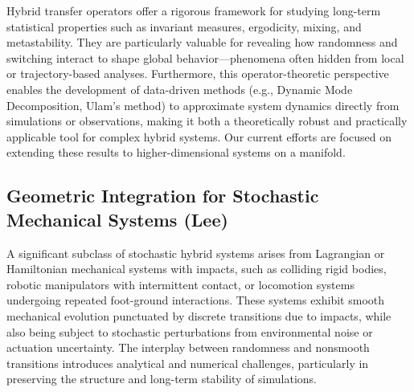\documentclass[letterpaper,11pt]{article}
\begin{document}
Hybrid transfer operators offer a rigorous framework for studying long-term statistical properties such as invariant measures, ergodicity, mixing, and metastability.
They are particularly valuable for revealing how randomness and switching interact to shape global behavior—phenomena often hidden from local or trajectory-based analyses.
Furthermore, this operator-theoretic perspective enables the development of data-driven methods (e.g., Dynamic Mode Decomposition, Ulam’s method) to approximate system dynamics directly from simulations or observations, making it both a theoretically robust and practically applicable tool for complex hybrid systems.
Our current efforts are focused on extending these results to higher-dimensional systems on a manifold.


\subsection{Geometric Integration for Stochastic Mechanical Systems (Lee)}\label{sec:geo_int}

A significant subclass of stochastic hybrid systems arises from Lagrangian or Hamiltonian mechanical systems with impacts, such as colliding rigid bodies, robotic manipulators with intermittent contact, or locomotion systems undergoing repeated foot-ground interactions. 
These systems exhibit smooth mechanical evolution punctuated by discrete transitions due to impacts, while also being subject to stochastic perturbations from environmental noise or actuation uncertainty. 
The interplay between randomness and nonsmooth transitions introduces analytical and numerical challenges, particularly in preserving the structure and long-term stability of simulations.
\end{document}
